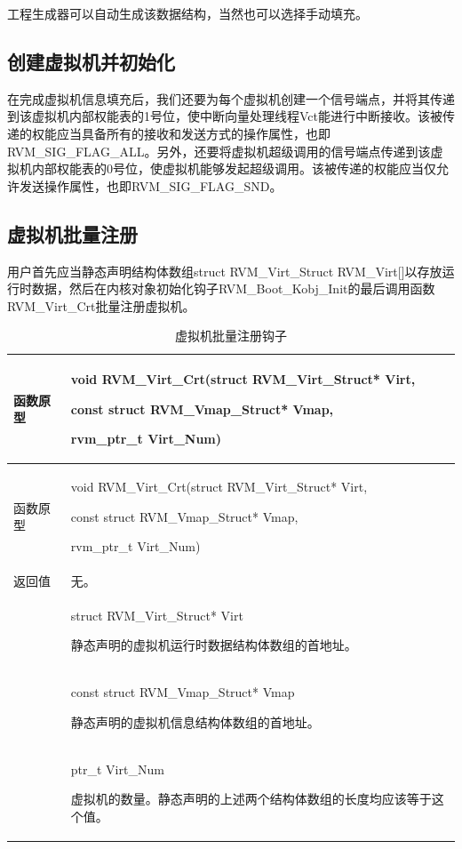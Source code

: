 工程生成器可以自动生成该数据结构，当然也可以选择手动填充。

\subsection{创建虚拟机并初始化}\label{subsec:4-2-2}

在完成虚拟机信息填充后，我们还要为每个虚拟机创建一个信号端点，并将其传递到该虚拟机内部权能表的1号位，使中断向量处理线程Vct能进行中断接收。该被传递的权能应当具备所有的接收和发送方式的操作属性，也即RVM\_SIG\_FLAG\_ALL。另外，还要将虚拟机超级调用的信号端点传递到该虚拟机内部权能表的0号位，使虚拟机能够发起超级调用。该被传递的权能应当仅允许发送操作属性，也即RVM\_SIG\_FLAG\_SND。

\subsection{虚拟机批量注册}\label{subsec:4-2-3}

用户首先应当静态声明结构体数组struct RVM\_Virt\_Struct
RVM\_Virt{[}{]}以存放运行时数据，然后在内核对象初始化钩子RVM\_Boot\_Kobj\_Init的最后调用函数RVM\_Virt\_Crt批量注册虚拟机。

\begin{xltabular}{\textwidth}{@{}>{\hsize\raggedright\arraybackslash}X>{\hsize\raggedright\arraybackslash}X@{}}
\caption{虚拟机批量注册钩子}\label{tab:4-2}\\
\toprule
函数原型\strut
 & void RVM\_\allowbreak{}Virt\_\allowbreak{}Crt(struct RVM\_\allowbreak{}Virt\_\allowbreak{}Struct* Virt,

const struct RVM\_\allowbreak{}Vmap\_\allowbreak{}Struct* Vmap,

rvm\_\allowbreak{}ptr\_\allowbreak{}t Virt\_\allowbreak{}Num)\strut
\tabularnewline
\endfirsthead
\toprule
函数原型\strut
 & void RVM\_\allowbreak{}Virt\_\allowbreak{}Crt(struct RVM\_\allowbreak{}Virt\_\allowbreak{}Struct* Virt,

const struct RVM\_\allowbreak{}Vmap\_\allowbreak{}Struct* Vmap,

rvm\_\allowbreak{}ptr\_\allowbreak{}t Virt\_\allowbreak{}Num)\strut
\tabularnewline
\midrule
\endhead
\bottomrule
\endlastfoot
返回值 & 无。\tabularnewline
{} & struct RVM\_\allowbreak{}Virt\_\allowbreak{}Struct* Virt

静态声明的虚拟机运行时数据结构体数组的首地址。\strut
\tabularnewline
\strut
 & const struct RVM\_\allowbreak{}Vmap\_\allowbreak{}Struct* Vmap

静态声明的虚拟机信息结构体数组的首地址。\strut
\tabularnewline
\strut
 & ptr\_\allowbreak{}t Virt\_\allowbreak{}Num

虚拟机的数量。静态声明的上述两个结构体数组的长度均应该等于这个值。\strut
\tabularnewline
\end{xltabular}

